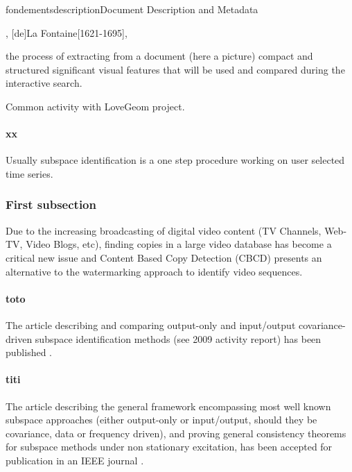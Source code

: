 \documentclass{ra2013}
\begin{document}
\begin{module}{fondements}{description}{Document Description and Metadata}


\begin{participants}
,
[de]{La Fontaine}[1621-1695],
\end{participants}

\begin{glossaire}
 {the process of extracting from a
  document (here a picture) compact and structured significant visual 
  features that will be used and compared during the interactive
  search.}
\end{glossaire}

\begin{moreinfo}
Common activity with LoveGeom project. 
\end{moreinfo}

\paragraph{xx}
Usually subspace identification is a one step procedure working on user selected time series. 

\subsubsection{First subsection}
Due to the increasing broadcasting of digital video content (TV
 Channels, Web-TV, Video Blogs, etc), finding copies in a large video
 database has become a critical new issue and Content Based Copy
 Detection (CBCD) presents an alternative to the watermarking
 approach to identify video sequences.

\paragraph{toto}
The article describing and comparing output-only and input/output covariance-driven subspace 
identification methods (see 2009 activity report) has been published \cite {Mlb-MpdSR}.

\paragraph{titi}
The article describing the general framework encompassing 
most well known subspace approaches (either output-only or input/output, 
should they be covariance, data or frequency driven),
and proving general consistency theorems for subspace methods under non stationary excitation,
has been accepted for publication in
an IEEE journal \cite{bretollet}.



\end{module}
\end{document}
